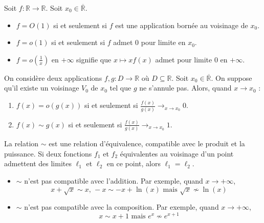 
  \begin{example}
    Soit $f : \mathbb{R} \rightarrow \mathbb{R}$. Soit $x_0 \in \overline{\mathbb{R}}$.
    \begin{itemize}
      \item $f = O(1)$ si et seulement si $f$ est une application bornée au voisinage de $x_0$.
      \item $f = o(1)$ si et seulement si $f$ admet $0$ pour limite en $x_0$.
      \item $f = o \left( \frac{1}{x} \right)$ en $+\infty$ signifie que $x \mapsto xf(x)$ admet pour limite $0$ en $+\infty$.
    \end{itemize}
  \end{example}

  \begin{proposition}
    On considère deux applications $f, g : D \rightarrow \mathbb{R}$ où $D \subseteq \mathbb{R}$. Soit $x_0 \in \overline{\mathbb{R}}$. On suppose qu'il existe un voisinage $V_0$ de $x_0$ tel que $g$ ne s'annule pas. Alors, quand $x \rightarrow x_0$ :
    \begin{enumerate}[label={\bfseries(\roman*)}]
      \item $f(x) = o(g(x))$ si et seulement si $\frac{f(x)}{g(x)} \longrightarrow_{x \rightarrow x_0} 0$.
      \item $f(x) \sim g(x)$ si et seulement si $\frac{f(x)}{g(x)} \longrightarrow_{x \rightarrow x_0} 1$.
    \end{enumerate}
  \end{proposition}

  \begin{proposition}
    La relation $\sim$ est une relation d'équivalence, compatible avec le produit et la puissance. Si deux fonctions $f_1$ et $f_2$ équivalentes au voisinage d'un point admettent des limites $\ell_1$ et $\ell_2$ en ce point, alors $\ell_1 = \ell_2$.
  \end{proposition}

  \begin{cexample}
    \begin{itemize}
      \item $\sim$ n'est pas compatible avec l'addition. Par exemple, quand $x \rightarrow +\infty$,
      \[ x + \sqrt{x} \sim x, \, -x \sim -x + \ln(x) \text{ mais } \sqrt{x} \nsim \ln(x) \]
      \item $\sim$ n'est pas compatible avec la composition. Par exemple, quand $x \rightarrow +\infty$,
      \[ x \sim x + 1 \text{ mais } e^{x} \nsim e^{x+1} \]
    \end{itemize}
  \end{cexample}

